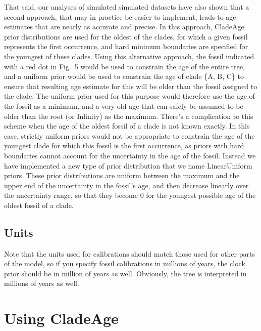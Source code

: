 \documentclass{article}
\begin{document}
That said, our analyses of simulated simulated datasets have also shown that a second approach, that may in practice be easier to implement, leads to age estimates that are nearly as accurate and precise. In this approach, CladeAge prior distributions are used for the oldest of the clades, for which a given fossil represents the first occurrence, and hard minimum boundaries are specified for the youngest of these clades. Using this alternative approach, the fossil indicated with a red dot in Fig.\ 5 would be used to constrain the age of the entire tree, and a uniform prior would be used to constrain the age of clade \{A, B, C\} to ensure that resulting age estimate for this will be older than the fossil assigned to the clade. The uniform prior used for this purpose would therefore use the age of the fossil as a minimum, and a very old age that can safely be assumed to be older than the root (or Infinity) as the maximum. There's a complication to this scheme when the age of the oldest fossil of a clade is not known exactly. In this case, strictly uniform priors would not be appropriate to constrain the age of the youngest clade for which this fossil is the first occurrence, as priors with hard boundaries cannot account for the uncertainty in the age of the fossil. Instead we have implemented a new type of prior distribution that we name LinearUniform priors. These prior distributions are uniform between the maximum and the upper end of the uncertainty in the fossil's age, and then decrease linearly over the uncertainty range, so that they become 0 for the youngest possible age of the oldest fossil of a clade.

\subsection{Units}
Note that the units used for calibrations should match those used for other
parts of the model, so if you specify fossil calibrations in millions of years, the
clock prior should be in million of years as well. Obviously, the tree is interpreted
in millions of years as well.


\section{Using CladeAge}
\end{document}
